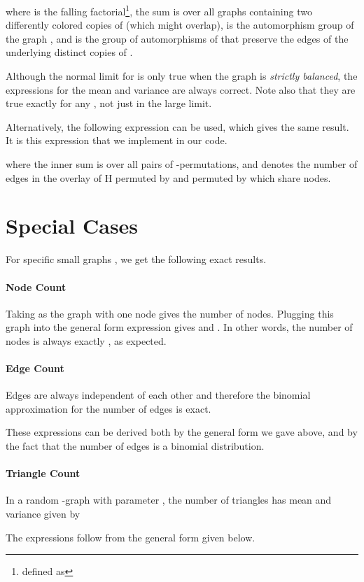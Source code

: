 \documentclass{article}
\begin{document}
where  is the falling factorial\footnote{defined
  as }, 
the sum is over all 
graphs  containing two differently colored copies of  (which might
overlap), 
 is the automorphism group of the graph , 
and  is the group of automorphisms of  that preserve
the edges of the underlying distinct copies of . 

Although the normal limit for  is only true when the
graph  is \emph{strictly balanced}, the expressions for the mean and
variance are always correct.  Note also that they are true exactly for
any , not just in the large  limit.  

Alternatively, the following expression can be used, which gives the
same result.  It is this expression that we implement in our code.  

where the inner sum is over all pairs of -permutations, and 
denotes the number of edges in the overlay of H permuted by  and 
permuted by  which share  nodes.

\section{Special Cases}
For specific small graphs , we get the following exact results. 

\paragraph{Node Count}
Taking  as the graph with one node gives the number of
nodes. Plugging this graph into the general form expression gives
 and .  In other words, the
number of nodes is always exactly , as expected. 

\paragraph{Edge Count}
Edges are always independent of each other and therefore the binomial
approximation for the number of edges  is exact.

These expressions can be derived both by the general form we gave above,
and by the fact that the number of edges is a binomial distribution. 

\paragraph{Triangle Count}
In a random -graph with parameter , the number of triangles 
has mean and variance given by


The expressions follow from the general form given below. 
\end{document}

